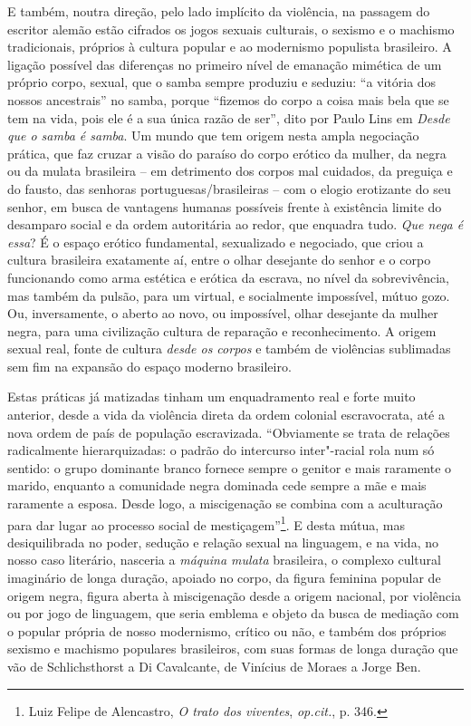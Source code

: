 E também, noutra direção, pelo lado implícito da violência, na passagem
do escritor alemão estão cifrados os jogos sexuais culturais, o sexismo
e o machismo tradicionais, próprios à cultura popular e ao modernismo
populista brasileiro. A ligação possível das diferenças no primeiro
nível de emanação mimética de um próprio corpo, sexual, que o samba
sempre produziu e seduziu: ``a vitória dos nossos ancestrais'' no samba,
porque ``fizemos do corpo a coisa mais bela que se tem na vida, pois ele
é a sua única razão de ser'', dito por Paulo Lins em \emph{Desde que o
samba é samba}. Um mundo que tem origem nesta ampla negociação prática,
que faz cruzar a visão do paraíso do corpo erótico da mulher, da negra
ou da mulata brasileira -- em detrimento dos corpos mal cuidados, da
preguiça e do fausto, das senhoras portuguesas/brasileiras -- com o
elogio erotizante do seu senhor, em busca de vantagens humanas possíveis
frente à existência limite do desamparo social e da ordem autoritária ao
redor, que enquadra tudo. \emph{Que nega é essa}? É o espaço erótico
fundamental, sexualizado e negociado, que criou a cultura brasileira
exatamente aí, entre o olhar desejante do senhor e o corpo funcionando
como arma estética e erótica da escrava, no nível da sobrevivência, mas
também da pulsão, para um virtual, e socialmente impossível, mútuo gozo.
Ou, inversamente, o aberto ao novo, ou impossível, olhar desejante da
mulher negra, para uma civilização cultura de reparação e
reconhecimento. A origem sexual real, fonte de cultura \emph{desde os
corpos} e também de violências sublimadas sem fim na expansão do espaço
moderno brasileiro.

Estas práticas já matizadas tinham um enquadramento real e forte muito
anterior, desde a vida da violência direta da ordem colonial
escravocrata, até a nova ordem de país de população escravizada.
``Obviamente se trata de relações radicalmente hierarquizadas: o padrão
do intercurso inter"-racial rola num só sentido: o grupo dominante branco
fornece sempre o genitor e mais raramente o marido, enquanto a
comunidade negra dominada cede sempre a mãe e mais raramente a esposa.
Desde logo, a miscigenação se combina com a aculturação para dar lugar
ao processo social de mestiçagem''\footnote{Luiz Felipe de Alencastro,
  \emph{O trato dos viventes}, \emph{op.cit.}, p. 346.}. E desta mútua,
mas desiquilibrada no poder, sedução e relação sexual na linguagem, e na
vida, no nosso caso literário, nasceria a \emph{máquina mulata}
brasileira, o complexo cultural imaginário de longa duração, apoiado no
corpo, da figura feminina popular de origem negra, figura aberta à
miscigenação desde a origem nacional, por violência ou por jogo de
linguagem, que seria emblema e objeto da busca de mediação com o popular
própria de nosso modernismo, crítico ou não, e também dos próprios
sexismo e machismo populares brasileiros, com suas formas de longa
duração que vão de Schlichsthorst a Di Cavalcante, de Vinícius de Moraes
a Jorge Ben.

